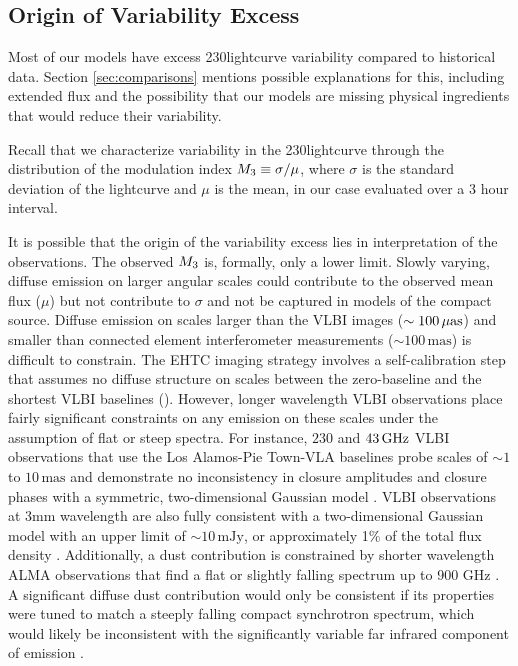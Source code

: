 

\subsection{Origin of Variability Excess}

Most of our models have excess 230\GHz lightcurve variability compared to historical data.
Section \ref{sec:comparisons} mentions possible explanations for this, including extended flux and the possibility that our models are missing physical ingredients that would reduce their variability.

Recall that we characterize variability in the 230\GHz lightcurve through the distribution of the modulation index $M_{3} \equiv \sigma/\mu$, where $\sigma$ is the standard deviation of the lightcurve and $\mu$ is the mean, in our case evaluated over a 3 hour interval.

It is possible that the origin of the variability excess lies in interpretation of the observations.
The observed $M_{3}$ is, formally, only a lower limit.  Slowly varying, diffuse emission on larger angular scales could contribute to the observed mean flux ($\mu$) but not contribute to $\sigma$ and not be captured in models of the compact source.  Diffuse emission on scales larger than the VLBI images ($\sim 100\,\mathrm{\mu as}$) and smaller than connected element interferometer measurements ($\sim 100\,\mathrm{mas}$) is difficult to constrain.  The EHTC imaging strategy involves a self-calibration step that assumes no diffuse structure on scales between the zero-baseline and the shortest VLBI baselines ().  However, longer wavelength VLBI observations place fairly significant constraints on any emission on these scales under the assumption of flat or steep spectra.  For instance, $230$ and $43\,\mathrm{GHz}$ VLBI observations that use the Los Alamos-Pie Town-VLA baselines probe scales of $\sim 1$ to $10\,\mathrm{mas}$ and demonstrate no inconsistency in closure amplitudes and closure phases with a symmetric, two-dimensional Gaussian model \citep{2004Sci...304..704B}.  VLBI observations at 3mm wavelength are also fully consistent with a two-dimensional Gaussian model with an upper limit of $\sim 10\,\mathrm{mJy}$, or approximately 1\% of the total flux density \citep{2019A&A...621A.119B}.  Additionally, a dust contribution is constrained by shorter wavelength ALMA observations that find a flat or slightly falling spectrum up to 900 GHz \citep{2019ApJ...881L...2B}.  A significant diffuse dust contribution would only be consistent if its properties were tuned to match a steeply falling compact synchrotron spectrum, which would likely be inconsistent with the significantly variable far infrared component of \sgra emission \citep{2016ApJ...825...32S, 2018ApJ...862..129V}.


